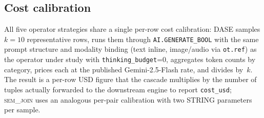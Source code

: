 \subsection{Cost calibration}

All five operator strategies share a single per-row cost calibration:
DASE samples $k{=}10$ representative rows, runs them through
\texttt{AI.GENERATE\_BOOL} with the same prompt structure and modality
binding (text inline, image/audio via \texttt{ot.ref}) as the operator
under study with \texttt{thinking\_budget}=$0$, aggregates token counts
by category, prices each at the published Gemini-2.5-Flash rate, and
divides by~$k$. The result is a per-row USD figure that the cascade
multiplies by the number of tuples actually forwarded to the downstream
engine to report \texttt{cost\_usd}; \textsc{sem\_join} uses an
analogous per-pair calibration with two STRING parameters per sample.
